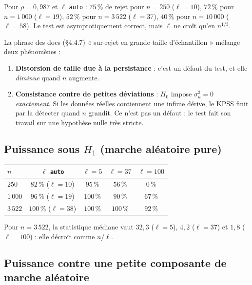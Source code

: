 \documentclass[11pt,a4paper]{article}
\newcommand{\code}[1]{\texttt{#1}}
\theoremstyle{definition}
\begin{document}
Pour $\rho = 0{,}987$ et $\ell$ \code{auto} : $75\,\%$ de rejet pour $n = 250$ ($\ell = 10$), $72\,\%$ pour $n = 1\,000$ ($\ell = 19$), $52\,\%$ pour $n = 3\,522$ ($\ell = 37$), $40\,\%$ pour $n = 10\,000$ ($\ell = 58$). Le test est asymptotiquement correct, mais $\ell$ ne croît qu'en $n^{1/3}$.

\begin{piege}
La phrase des docs (\S4.4.7) « sur-rejet en grande taille d'échantillon » mélange deux phénomènes :
\begin{enumerate}
\item \textbf{Distorsion de taille due à la persistance} : c'est un défaut du test, et elle \emph{diminue} quand $n$ augmente.
\item \textbf{Consistance contre de petites déviations} : $H_0$ impose $\sigma_u^2 = 0$ \emph{exactement}. Si les données réelles contiennent une infime dérive, le KPSS finit par la détecter quand $n$ grandit. Ce n'est pas un défaut : le test fait son travail sur une hypothèse nulle très stricte.
\end{enumerate}
\end{piege}

\subsection{Puissance sous \texorpdfstring{$H_1$}{H1} (marche aléatoire pure)}

\begin{center}
\begin{tabular}{@{}lcccc@{}}
\toprule
$n$ & $\ell$ \code{auto} & $\ell = 5$ & $\ell = 37$ & $\ell = 100$ \\
\midrule
$250$ & $82\,\%$ ($\ell = 10$) & $95\,\%$ & $56\,\%$ & $0\,\%$ \\
$1\,000$ & $96\,\%$ ($\ell = 19$) & $100\,\%$ & $90\,\%$ & $67\,\%$ \\
$3\,522$ & $100\,\%$ ($\ell = 38$) & $100\,\%$ & $100\,\%$ & $92\,\%$ \\
\bottomrule
\end{tabular}
\end{center}

Pour $n = 3\,522$, la statistique médiane vaut $32{,}3$ ($\ell = 5$), $4{,}2$ ($\ell = 37$) et $1{,}8$ ($\ell = 100$) : elle décroît comme $n/\ell$.

\subsection{Puissance contre une petite composante de marche aléatoire}
\end{document}

